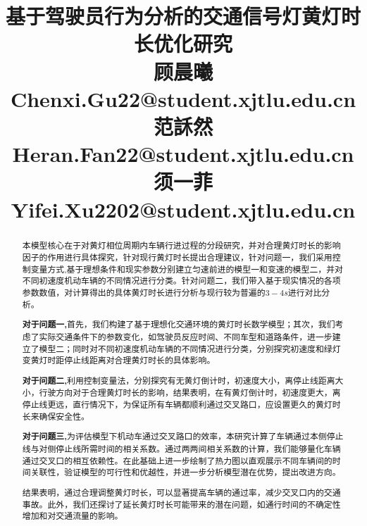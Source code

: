 \documentclass[withoutpreface,bwprint]{cumcmthesis}
\title{基于驾驶员行为分析的交通信号灯黄灯时长优化研究\\ \small{顾晨曦 Chenxi.Gu22@student.xjtlu.edu.cn}\\\small{范訸然 Heran.Fan22@student.xjtlu.edu.cn}\\\small{须一菲 Yifei.Xu2202@}student.xjtlu.edu.cn\\}  %
\begin{document}
\maketitle
\begin{abstract}
	本模型核心在于对黄灯相位周期内车辆行进过程的分段研究，并对合理黄灯时长的影响因子的作用进行具体探究，针对现行黄灯时长提出合理建议，针对问题一，我们采用控制变量方式,基于理想条件和现实参数分别建立匀速前进的模型一和变速的模型二，并对不同初速度机动车辆的不同情况进行分类。针对问题二，我们带入基于现实情况的各项参数数值，对计算得出的具体黄灯时长进行分析与现行较为普遍的$3-4s$进行对比分析。
	
\textbf{对于问题一,}首先，我们构建了基于理想化交通环境的黄灯时长数学模型；其次，我们考虑了实际交通条件下的参数变化，如驾驶员反应时间、不同车型和道路条件，进一步建立了模型二；同时对不同初速度机动车辆的不同情况进行分类，分别探究初速度和绿灯变黄灯时距停止线距离对合理黄灯时长的具体影响。

\textbf{对于问题二,}利用控制变量法，分别探究有无黄灯倒计时，初速度大小，离停止线距离大小，行驶方向对于合理黄灯时长的影响，结果表明，在有黄灯倒计时，初速度更大，离停止线更远，直行情况下，为保证所有车辆都顺利通过交叉路口，应设置更久的黄灯时长来确保安全性。

\textbf{对于问题三,}为评估模型下机动车通过交叉路口的效率，本研究计算了车辆通过本侧停止线与对侧停止线所需时间的相关系数。通过两两间相关系数的计算，我们能够量化车辆通过交叉口的相互依赖性。在此基础上进一步绘制了热力图以直观展示不同车辆间的时间关联性，验证模型的可行性和优越性，并进一步分析模型潜在优势，提出改进方向。

结果表明，通过合理调整黄灯时长，可以显著提高车辆的通过率，减少交叉口内的交通事故。此外，我们还探讨了延长黄灯时长可能带来的潜在问题，如通行时间的不确定性增加和对交通流量的影响。
%
%

\end{abstract}
\end{document}
